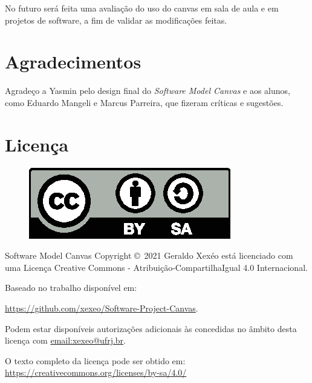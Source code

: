 \documentclass[a4]{report}
\begin{document}
No futuro será feita uma avaliação do uso do canvas em sala de aula e em projetos de software, a fim de validar as modificações feitas.



\section*{Agradecimentos}

Agradeço a Yasmin pelo design final do \textit{Software Model Canvas} e aos alunos, como Eduardo Mangeli e Marcus Parreira, que fizeram críticas e sugestões.

\newpage

\section*{Licença}

\begin{figure}[h]
    \centering
    \includegraphics{imagens/by-sa}
    \label{fig:by-sa}
\end{figure}


Software Model Canvas Copyright \copyright\  2021 Geraldo Xexéo está licenciado com uma Licença Creative Commons - Atribuição-CompartilhaIgual 4.0 Internacional.

Baseado no trabalho disponível em:

\url{https://github.com/xexeo/Software-Project-Canvas}.

Podem estar disponíveis autorizações adicionais às concedidas no âmbito desta licença com \url{email:xexeo@ufrj.br}.

O texto completo da licença pode ser obtido em:
\url{https://creativecommons.org/licenses/by-sa/4.0/}

\printbibliography
\end{document}
